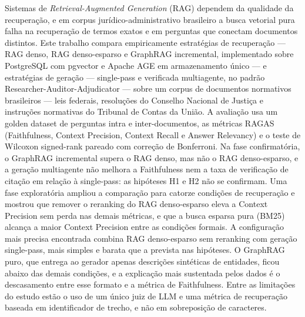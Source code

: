 
\begin{resumo}
Sistemas de \textit{Retrieval-Augmented Generation} (RAG) dependem da
qualidade da recuperação, e em corpus jurídico-administrativo brasileiro a
busca vetorial pura falha na recuperação de termos exatos e em perguntas que
conectam documentos distintos. Este trabalho compara empiricamente estratégias
de recuperação --- RAG denso, RAG denso-esparso e GraphRAG incremental,
implementado sobre PostgreSQL com pgvector e Apache AGE em armazenamento
único --- e estratégias de geração --- single-pass e verificada multiagente,
no padrão Researcher-Auditor-Adjudicator --- sobre um corpus de documentos
normativos brasileiros --- leis federais, resoluções do Conselho Nacional de
Justiça e instruções normativas do Tribunal de Contas da União. A avaliação
usa um golden dataset de perguntas intra e inter-documentos, as métricas
RAGAS (Faithfulness, Context Precision, Context Recall e Answer Relevancy) e
o teste de Wilcoxon signed-rank pareado com correção de Bonferroni. Na fase
confirmatória, o GraphRAG incremental supera o RAG denso, mas não o RAG
denso-esparso, e a geração multiagente não melhora a Faithfulness nem a taxa
de verificação de citação em relação à single-pass: as hipóteses H1 e H2 não
se confirmam. Uma fase exploratória ampliou a comparação para catorze
condições de recuperação e mostrou que remover o reranking do RAG
denso-esparso eleva a Context Precision sem perda nas demais métricas, e que
a busca esparsa pura (BM25) alcança a maior Context Precision entre as
condições formais. A configuração mais precisa encontrada combina RAG
denso-esparso sem reranking com geração single-pass, mais simples e barata
que a prevista nas hipóteses. O GraphRAG puro, que entrega ao gerador apenas
descrições sintéticas de entidades, ficou abaixo das demais condições, e a
explicação mais sustentada pelos dados é o descasamento entre esse formato e
a métrica de Faithfulness. Entre as limitações do estudo estão o uso de um
único juiz de LLM e uma métrica de recuperação baseada em identificador de
trecho, e não em sobreposição de caracteres.
\end{resumo}
